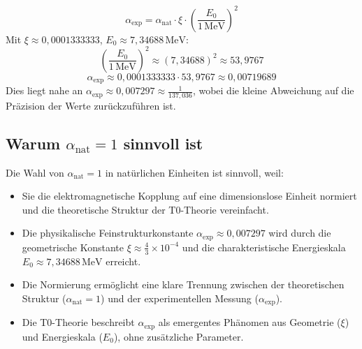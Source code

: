 \documentclass[12pt,a4paper]{article}
\theoremstyle{definition}
\begin{document}
\[
\alpha_{\text{exp}} = \alpha_{\text{nat}} \cdot \xi \cdot \left(\frac{E_0}{1 \, \text{MeV}}\right)^2
\]
Mit \(\xi \approx 0{,}0001333333\), \(E_0 \approx 7{,}34688 \, \text{MeV}\):
\[
\left(\frac{E_0}{1 \, \text{MeV}}\right)^2 \approx (7{,}34688)^2 \approx 53{,}9767
\]
\[
\alpha_{\text{exp}} \approx 0{,}0001333333 \cdot 53{,}9767 \approx 0{,}00719689
\]
Dies liegt nahe an \(\alpha_{\text{exp}} \approx 0{,}007297 \approx \frac{1}{137{,}036}\), wobei die kleine Abweichung auf die Präzision der Werte zurückzuführen ist.

\subsection*{Warum \(\alpha_{\text{nat}} = 1\) sinnvoll ist}

Die Wahl von \(\alpha_{\text{nat}} = 1\) in natürlichen Einheiten ist sinnvoll, weil:
\begin{itemize}
	\item Sie die elektromagnetische Kopplung auf eine dimensionslose Einheit normiert und die theoretische Struktur der T0-Theorie vereinfacht.
	\item Die physikalische Feinstrukturkonstante \(\alpha_{\text{exp}} \approx 0{,}007297\) wird durch die geometrische Konstante \(\xi \approx \frac{4}{3} \times 10^{-4}\) und die charakteristische Energieskala \(E_0 \approx 7{,}34688 \, \text{MeV}\) erreicht.
	\item Die Normierung ermöglicht eine klare Trennung zwischen der theoretischen Struktur (\(\alpha_{\text{nat}} = 1\)) und der experimentellen Messung (\(\alpha_{\text{exp}}\)).
	\item Die T0-Theorie beschreibt \(\alpha_{\text{exp}}\) als emergentes Phänomen aus Geometrie (\(\xi\)) und Energieskala (\(E_0\)), ohne zusätzliche Parameter.
\end{itemize}
	
\end{document}
